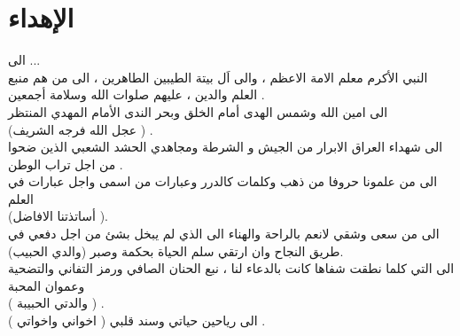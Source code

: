 \chapter*{الإهداء}

\begin{center}
	الى ... \\[10pt]
	
	النبي  الأكرم معلم الامة الاعظم ، والى اَل بيتة الطيبين الطاهرين ، الى من هم منبع العلم والدين ، عليهم صلوات الله وسلامة أجمعين . \\ [10pt]
	الى امين الله وشمس الهدى أمام الخلق وبحر الندى الأمام المهدي المنتظر \\
	(عجل الله فرجه الشريف ) . \\[10pt]
	
	الى شهداء العراق الابرار من الجيش و الشرطة ومجاهدي الحشد الشعبي الذين ضحوا من اجل تراب الوطن . \\[10pt]
	
	الى من علمونا حروفا من ذهب وكلمات كالدرر وعبارات من اسمى واجل عبارات في العلم  \\
	(أساتذتنا الافاضل ). \\[10pt]
	
	الى من سعى وشقي لانعم بالراحة والهناء الى الذي لم يبخل بشئ من اجل دفعي في طريق النجاح وان ارتقي سلم الحياة بحكمة وصبر (والدي الحبيب). \\[10pt]
	
	الى التي كلما نطقت شفاها كانت بالدعاء لنا ، نبع الحنان الصافي ورمز التفاني والتضحية وعموان المحبة\\
	( والدتي الحبيبة ) . \\[10pt]
	
	الى رياحين حياتي وسند قلبي ( اخواني واخواتي ) .
\end{center}
